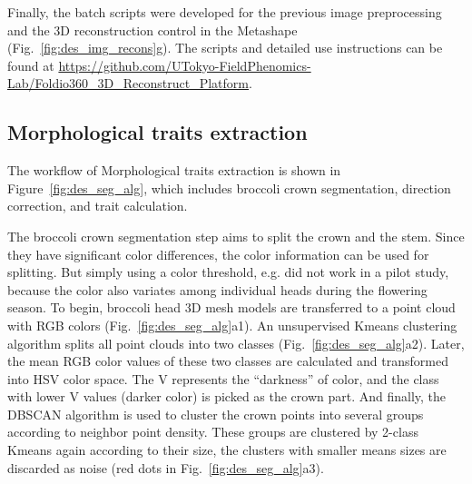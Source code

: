 Finally, the batch scripts were developed for the previous image preprocessing and the 3D reconstruction control in the Metashape (Fig.~\ref{fig:des_img_recons}g). The scripts and detailed use instructions can be found at \url{https://github.com/UTokyo-FieldPhenomics-Lab/Foldio360_3D_Reconstruct_Platform}.

\subsection{Morphological traits extraction}

The workflow of Morphological traits extraction is shown in Figure~\ref{fig:des_seg_alg}, which includes broccoli crown segmentation, direction correction, and trait calculation.



The broccoli crown segmentation step aims to split the crown and the stem. Since they have significant color differences, the color information can be used for splitting. But simply using a color threshold, e.g. \citet{otsu_threshold_1979} did not work in a pilot study, because the color also variates among individual heads during the flowering season. To begin, broccoli head 3D mesh models are transferred to a point cloud with RGB colors (Fig.~\ref{fig:des_seg_alg}a1). An unsupervised Kmeans clustering algorithm splits all point clouds into two classes (Fig.~\ref{fig:des_seg_alg}a2). Later, the mean RGB color values of these two classes are calculated and transformed into \acrfull{HSV} color space. The V represents the ``darkness'' of color, and the class with lower V values (darker color) is picked as the crown part. And finally, the \acrfull{DBSCAN} algorithm is used to cluster the crown points into several groups according to neighbor point density. These groups are clustered by 2-class Kmeans again according to their size, the clusters with smaller means sizes are discarded as noise (red dots in Fig.~\ref{fig:des_seg_alg}a3).

